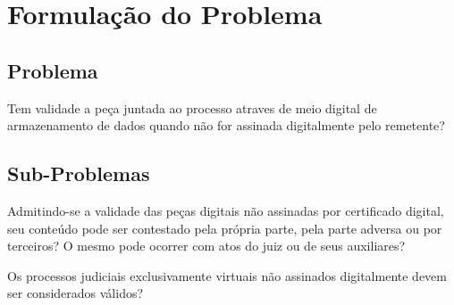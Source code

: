 \chapter{Formulação do Problema}

\section{Problema}
Tem validade a peça juntada ao processo atraves de meio digital de armazenamento de dados quando não for assinada digitalmente pelo remetente?

\section{Sub-Problemas}
Admitindo-se a validade das peças digitais não assinadas por certificado digital, seu conteúdo pode ser contestado pela própria parte, pela parte adversa ou por terceiros? O mesmo pode ocorrer com atos do juiz ou de seus auxiliares?\par

Os processos judiciais exclusivamente virtuais não assinados digitalmente devem ser considerados válidos?
